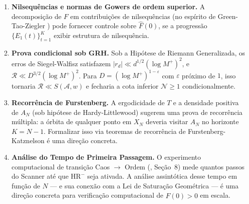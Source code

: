 \documentclass[12pt,a4paper]{article}
\theoremstyle{definition}
\newcommand{\HRm}{\mathrm{HR}^{-}}
\begin{document}
	\begin{enumerate}
		\item \textbf{Nilsequências e normas de Gowers de ordem
			superior.} A decomposição de $F$ em contribuições de
		nilsequências (no espírito de Green-Tao-Ziegler \cite{greentao})
		pode fornecer controle sobre $\widehat{F}(0)$, se a progressão
		$\{E_1(t)\}_{t=1}^K$ exibir estrutura de nilsequência.
		
		\item \textbf{Prova condicional sob GRH.} Sob a Hipótese de
		Riemann Generalizada, os erros de Siegel-Walfisz satisfazem
		$|r_d| \ll d^{1/2}(\log M^+)^2$, e
		$\mathcal{R} \ll D^{3/2}(\log M^+)^2$. Para
		$D = (\log M^+)^{1-\varepsilon}$ com $\varepsilon$ próximo de
		$1$, isso tornaria $\mathcal{R} \ll S(\mathcal{A},w)$ e fecharia
		a cota inferior $\mathcal{N} \geq 1$ condicionalmente.
		
		\item \textbf{Recorrência de Furstenberg.} A ergodicidade de $T$
		e a densidade positiva de $A_N$ (sob hipótese de
		Hardy-Littlewood) sugerem uma prova de recorrência múltipla: a
		órbita de qualquer ponto em $X_N$ deveria visitar $A_N$ no
		horizonte $K = N-1$. Formalizar isso via teoremas de recorrência
		de Furstenberg-Katznelson é uma direção concreta.
		
		\item \textbf{Análise do Tempo de Primeira Passagem.} O
		experimento computacional de transição Caos $\to$ Ordem
		(\cite{motor}, Seção~8) mede quantos passos do Scanner até que
		$\HRm$ seja ativada. A análise assintótica desse tempo em função
		de $N$ — e sua conexão com a Lei de Saturação Geométrica —
		é uma direção concreta para verificação computacional de
		$\widehat{F}(0) > 0$ em escala.
	\end{enumerate}
	
\end{document}
